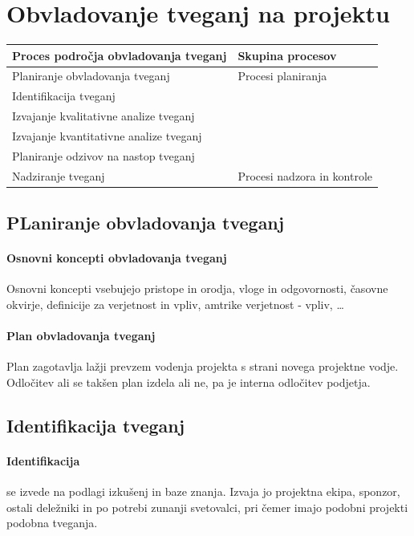 \documentclass[a4paper,12pt]{report}
\begin{document}
   \section{Obvladovanje tveganj na projektu}
      \begin{center}
         \begin{tabular}{|l|l|}
            \hline
            \textbf{Proces področja obvladovanja tveganj} & \textbf{Skupina procesov} \\
            \hline
            \hline
            Planiranje obvladovanja tveganj & Procesi planiranja \\
            Identifikacija tveganj & \\
            Izvajanje kvalitativne analize tveganj & \\
            Izvajanje kvantitativne analize tveganj & \\
            Planiranje odzivov na nastop tveganj & \\
            \hline
            Nadziranje tveganj & Procesi nadzora in kontrole \\
            \hline
         \end{tabular}
      \end{center}

      \subsection{PLaniranje obvladovanja tveganj}
         \paragraph{Osnovni koncepti obvladovanja tveganj} Osnovni koncepti vsebujejo pristope in orodja, vloge in odgovornosti, časovne okvirje, definicije za verjetnost in vpliv, amtrike verjetnost - vpliv, \dots
         \paragraph{Plan obvladovanja tveganj} Plan zagotavlja lažji prevzem vodenja projekta s strani novega projektne vodje. Odločitev ali se takšen plan izdela ali ne, pa je interna odločitev podjetja.

      \subsection{Identifikacija tveganj}
         \paragraph{Identifikacija} se izvede na podlagi izkušenj in baze znanja. Izvaja jo projektna ekipa, sponzor, ostali deležniki in po potrebi zunanji svetovalci, pri čemer imajo podobni projekti podobna tveganja.
\end{document}

